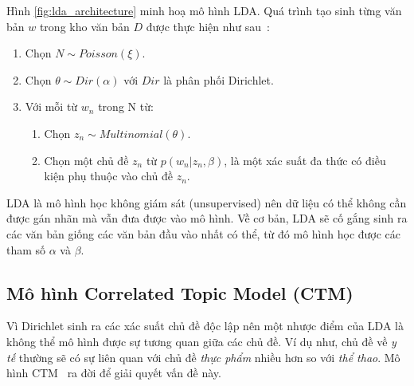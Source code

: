 

Hình \ref{fig:lda_architecture} minh hoạ mô hình LDA. Quá trình tạo sinh từng văn bản $w$ trong kho văn bản $D$ được thực hiện như sau~\cite{bleiLatentDirichletAllocation2003}:

\begin{enumerate}
	\item Chọn $N \sim Poisson(\xi)$.
	\item Chọn $\theta \sim Dir(\alpha)$ với $Dir$ là phân phối Dirichlet.
	\item Với mỗi từ $w_n$ trong N từ:
	\begin{enumerate}
		\item Chọn $z_n \sim Multinomial(\theta)$.
		\item Chọn một chủ đề $z_n$ từ $p(w_n|z_n,\beta)$, là một xác suất đa thức có điều kiện phụ thuộc vào chủ đề $z_n$.
	\end{enumerate}
\end{enumerate}

LDA là mô hình học không giám sát (unsupervised) nên dữ liệu có thể không cần được gán nhãn mà vẫn đưa được vào mô hình. Về cơ bản, LDA sẽ cố gắng sinh ra các văn bản giống các văn bản đầu vào nhất có thể, từ đó mô hình học được các tham số $\alpha$ và $\beta$.

\subsection{Mô hình Correlated Topic Model (CTM)}
Vì Dirichlet sinh ra các xác suất chủ đề độc lập nên một nhược điểm của LDA là không thể mô hình được sự tương quan giữa các chủ đề. Ví dụ như, chủ đề về \textit{y tế} thường sẽ có sự liên quan với chủ đề \textit{thực phẩm} nhiều hơn so với \textit{thể thao}. Mô hình CTM~\cite{laffertyCorrelatedTopicModels2006} ra đời để giải quyết vấn đề này.


